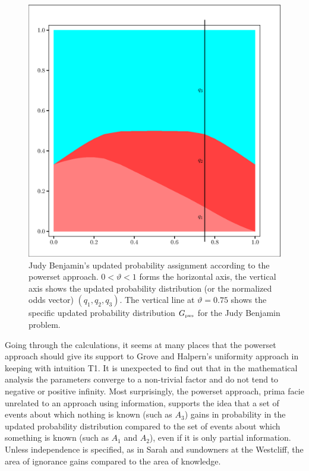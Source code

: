 \documentclass[smallextended]{svjour3}       %
\newcommand{\lwv}[0]{0.6}
\newcommand{\qvu}[0]{\vartheta}
\begin{document}
\begin{figure}[h!]
  \begin{flushright}
    \begin{minipage}[h]{\lwv\linewidth}
      \includegraphics[width=\textwidth]{zeroone-pwst.eps}
      \caption{Judy Benjamin's updated probability assignment
        according to the powerset approach. $0<{\qvu}<1$ forms the
        horizontal axis, the vertical axis shows the updated
        probability distribution (or the normalized odds vector)
        $(q_{1},q_{2},q_{3})$. The vertical line at ${\qvu}=0.75$ shows the
        specific updated probability distribution $G_{\mbox{\tiny
            pws}}$ for the Judy Benjamin problem.}
      \label{fig:pwst}
    \end{minipage}
  \end{flushright}
\end{figure}

Going through the calculations, it seems at many places that the
powerset approach should give its support to Grove and Halpern's
uniformity approach in keeping with intuition T1. It is unexpected to
find out that in the mathematical analysis the parameters converge to
a non-trivial factor and do not tend to negative or positive infinity.
Most surprisingly, the powerset approach, prima facie unrelated to an
approach using information, supports the idea that a set of events
about which nothing is known (such as $A_{3}$) gains in probability in
the updated probability distribution compared to the set of events
about which something is known (such as $A_{1}$ and $A_{2}$), even if
it is only partial information. Unless independence is specified, as
in Sarah and sundowners at the Westcliff, the area of ignorance gains
compared to the area of knowledge.
\end{document}

